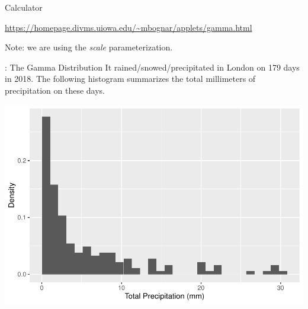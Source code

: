 \begin{frame}

\begin{block}{Calculator}

\begin{center}
\url{https://homepage.divms.uiowa.edu/~mbognar/applets/gamma.html}
\end{center}

\bigskip

Note: we are using the \textit{scale} parameterization.
\end{block}
\end{frame}





\begin{frame}
  
  \begin{block}{\example: The Gamma Distribution}
    It rained/snowed/precipitated in London on 179 days in 2018. The following histogram summarizes the total millimeters of precipitation on these days.

    \begin{center}
      \includegraphics[height=.6\textheight]{figure/gamma1-1}
    \end{center}

  \end{block}
\end{frame}

